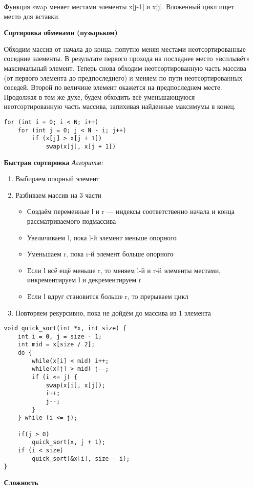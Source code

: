 Функция swap меняет местами элементы x[j-1] и x[j]. Вложенный цикл ищет место для вставки.

\textbf{Сортировка обменами (пузырьком)}

Обходим массив от начала до конца, попутно меняя местами неотсортированные соседние элементы. В результате первого прохода на последнее место «всплывёт» максимальный элемент. Теперь снова обходим неотсортированную часть массива (от первого элемента до предпоследнего) и меняем по пути неотсортированных соседей. Второй по величине элемент окажется на предпоследнем месте. Продолжая в том же духе, будем обходить всё уменьшающуюся неотсортированную часть массива, запихивая найденные максимумы в конец.
\begin{verbatim}
for (int i = 0; i < N; i++)
    for (int j = 0; j < N - i; j++)
        if (x[j] > x[j + 1])
            swap(x[j], x[j + 1])
\end{verbatim}
\textbf{Быстрая сортировка}
\textit{Алгоритм:}
\begin{enumerate}
    \item Выбираем опорный элемент
    \item Разбиваем массив на 3 части
    \begin{itemize}
        \item Создаём переменные l и r — индексы соответственно начала и конца рассматриваемого подмассива
        \item Увеличиваем l, пока l-й элемент меньше опорного
        \item Уменьшаем r, пока r-й элемент больше опорного
        \item Если l всё ещё меньше r, то меняем l-й и r-й элементы местами, инкрементируем l и декрементируем r
        \item Если l вдруг становится больше r, то прерываем цикл
    \end{itemize}
    \item Повторяем рекурсивно, пока не дойдём до массива из 1 элемента
\end{enumerate}


\begin{verbatim}
void quick_sort(int *x, int size) {
    int i = 0, j = size - 1;
    int mid = x[size / 2];
    do {
        while(x[i] < mid) i++;
        while(x[j] > mid) j--;
        if (i <= j) {
            swap(x[i], x[j]);
            i++;
            j--;
        }
    } while (i <= j);
    
    if(j > 0)
        quick_sort(x, j + 1);
    if (i < size)
        quick_sort(&x[i], size - i);
}
\end{verbatim}
\textbf{Сложность}

